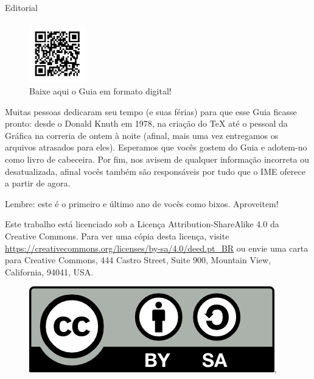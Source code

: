 \begin{editorial}{Editorial}
\paragraph{}
\begin{figure}
  \vspace{-30pt}
  \begin{center}
    \includegraphics[width=0.22\textwidth]{img/qrcode.pdf}
  \end{center}
  \vspace{-20pt}
  \caption{Baixe aqui o Guia em formato digital!}
  \vspace{-50pt}
\end{figure}
Muitas pessoas dedicaram seu tempo (e suas férias) para que esse Guia ficasse
pronto: desde o Donald Knuth em 1978, na criação do \TeX\makebox{} até o
pessoal da Gráfica na correria de ontem à noite (afinal, mais uma vez
entregamos os arquivos atrasados para eles). Esperamos que vocês gostem do Guia
e adotem-no como livro de cabeceira. Por fim, nos avisem de qualquer informação
incorreta ou desatualizada, afinal vocês também são responsáveis por tudo que o
IME oferece a partir de agora.

\vspace{5em}
Lembre: este é o primeiro e último ano de vocês como bixos. Aproveitem!


Este trabalho está licenciado sob a Licença Attribution-ShareAlike 4.0 da
Creative Commons. Para ver uma cópia desta licença, visite
\url{https://creativecommons.org/licenses/by-sa/4.0/deed.pt_BR} ou envie
uma carta para Creative Commons, 444 Castro Street, Suite 900, Mountain View,
California, 94041, USA.
\\
\begin{figure}[H]
    \centering
    \includegraphics{img/cc/by-sa.png},
\end{figure}

\end{editorial}
